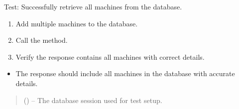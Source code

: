 \documentclass[letterpaper,10pt,english]{sphinxmanual}
\begin{document}
\begin{fulllineitems}
\label{\detokenize{test:test.test_machine.test_list_all_machines_success}}
\pysigstartsignatures
\pysiglinewithargsret
{}
{}
{}
\pysigstopsignatures
\sphinxAtStartPar
Test: Successfully retrieve all machines from the database.
\begin{description}
\begin{enumerate}
%
\item {} 
\sphinxAtStartPar
Add multiple machines to the database.

\item {} 
\sphinxAtStartPar
Call the  method.

\item {} 
\sphinxAtStartPar
Verify the response contains all machines with correct details.

\end{enumerate}

\begin{itemize}
\item {} 
\sphinxAtStartPar
The response should include all machines in the database with accurate details.

\end{itemize}

\end{description}
\begin{quote}\begin{description}
\sphinxAtStartPar
{} () – The database session used for test setup.

\end{description}\end{quote}

\end{fulllineitems}

\end{document}

